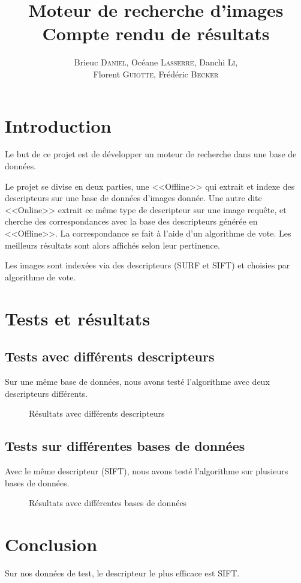 \documentclass{article}
\author{Brieuc \textsc{Daniel}, Océane \textsc{Lasserre}, Danchi \textsc{Li}, \\ Florent \textsc{Guiotte}, Frédéric \textsc{Becker}}
\title{Moteur de recherche d'images \\ \Large{Compte rendu de résultats}}
\begin{document}
\maketitle
\tableofcontents

\section{Introduction}

Le but de ce projet est de développer un moteur de recherche dans une base de données. 

Le projet se divise en deux parties, une <<Offline>> qui extrait et indexe des descripteurs sur une base de données
d'images donnée. Une autre dite <<Online>> extrait ce même type de descripteur sur une image requête, et cherche des
correspondances avec la base des descripteurs générée en <<Offline>>. La correspondance se fait à l'aide d'un 
algorithme de vote. Les meilleurs résultats sont alors affichés selon leur pertinence. 

Les images sont indexées via des descripteurs (SURF et SIFT) et choisies par algorithme de vote.

\section{Tests et résultats}
\subsection{Tests avec différents descripteurs}

Sur une même base de données, nous avons testé l'algorithme avec deux descripteurs différents.
\begin{figure}[!ht]%
  \centering
  \hspace{0.04\textwidth}
  \caption{Résultats avec différents descripteurs}
  \label{desc}
\end{figure}

\subsection{Tests sur différentes bases de données}

Avec le même descripteur (SIFT), nous avons testé l'algorithme sur plusieurs bases de données.
\begin{figure}[!ht]%
  \centering
  \hspace{0.04\textwidth}
  \caption{Résultats avec différentes bases de données}
  \label{desc}
\end{figure}

\section{Conclusion}

Sur nos données de test, le descripteur le plus efficace est SIFT. 
\end{document}
